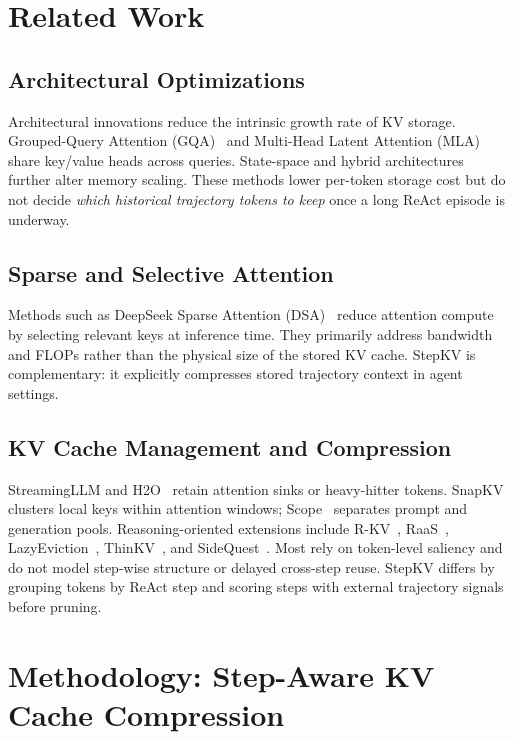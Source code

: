 \documentclass[11pt]{article}
\begin{document}
\section{Related Work}

\subsection{Architectural Optimizations}

Architectural innovations reduce the intrinsic growth rate of KV storage.
Grouped-Query Attention (GQA)~\cite{gqa} and Multi-Head Latent Attention (MLA)~\cite{mla} share key/value heads across queries.
State-space and hybrid architectures~\cite{gu2023mamba,yang2024gateddelta,qwen2025next,nvidia2025nemotron} further alter memory scaling.
These methods lower per-token storage cost but do not decide \emph{which historical trajectory tokens to keep} once a long ReAct episode is underway.

\subsection{Sparse and Selective Attention}

Methods such as DeepSeek Sparse Attention (DSA)~\cite{liu2025dsa} reduce attention compute by selecting relevant keys at inference time.
They primarily address bandwidth and FLOPs rather than the physical size of the stored KV cache.
StepKV is complementary: it explicitly compresses stored trajectory context in agent settings.

\subsection{KV Cache Management and Compression}

StreamingLLM and H2O~\cite{zhang2023h2o} retain attention sinks or heavy-hitter tokens.
SnapKV~\cite{li2024snapkv} clusters local keys within attention windows; Scope~\cite{scope} separates prompt and generation pools.
Reasoning-oriented extensions include R-KV~\cite{cai2025rkv}, RaaS~\cite{hu2025raas}, LazyEviction~\cite{zhang2025lazyeviction}, ThinKV~\cite{ramachandran2025thinkv}, and SideQuest~\cite{sidequest}.
Most rely on token-level saliency and do not model step-wise structure or delayed cross-step reuse.
StepKV differs by grouping tokens by ReAct step and scoring steps with external trajectory signals before pruning.

\section{Methodology: Step-Aware KV Cache Compression}
\label{sec:methodology}
\end{document}
